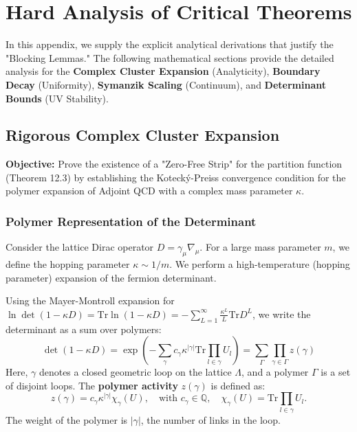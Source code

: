 \section{Hard Analysis of Critical Theorems}
\label{app:hard_analysis}

In this appendix, we supply the explicit analytical derivations that justify the "Blocking Lemmas." The following mathematical sections provide the detailed analysis for the \textbf{Complex Cluster Expansion} (Analyticity), \textbf{Boundary Decay} (Uniformity), \textbf{Symanzik Scaling} (Continuum), and \textbf{Determinant Bounds} (UV Stability).

\subsection{Rigorous Complex Cluster Expansion}
\label{sec:complex_cluster}

\textbf{Objective:} Prove the existence of a "Zero-Free Strip" for the partition function (Theorem 12.3) by establishing the Koteck\'y-Preiss convergence condition for the polymer expansion of Adjoint QCD with a complex mass parameter $\kappa$.

\subsubsection{Polymer Representation of the Determinant}
Consider the lattice Dirac operator $D = \gamma_\mu \nabla_\mu$. For a large mass parameter $m$, we define the hopping parameter $\kappa \sim 1/m$. We perform a high-temperature (hopping parameter) expansion of the fermion determinant.

Using the Mayer-Montroll expansion for $\ln \det (1 - \kappa D) = \text{Tr} \ln (1 - \kappa D) = -\sum_{L=1}^\infty \frac{\kappa^L}{L} \text{Tr} D^L$, we write the determinant as a sum over polymers:
\[
\det(1 - \kappa D) = \exp\left( - \sum_{\gamma} c_\gamma \kappa^{|\gamma|} \text{Tr} \prod_{l \in \gamma} U_l \right) = \sum_{\Gamma} \prod_{\gamma \in \Gamma} z(\gamma)
\]
Here, $\gamma$ denotes a closed geometric loop on the lattice $\Lambda$, and a polymer $\Gamma$ is a set of disjoint loops. The \textbf{polymer activity} $z(\gamma)$ is defined as:
\[
z(\gamma) = c_\gamma \kappa^{|\gamma|} \chi_\gamma(U), \quad \text{with } c_\gamma \in \mathbb{Q}, \quad \chi_\gamma(U) = \text{Tr} \prod_{l \in \gamma} U_l.
\]
The weight of the polymer is $|\gamma|$, the number of links in the loop.

